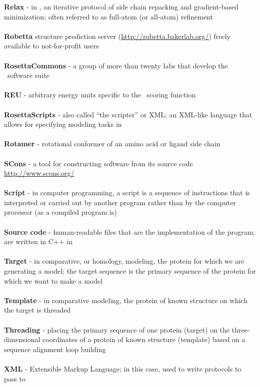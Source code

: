 \textbf{Relax} - in \rosetta, an iterative protocol of side chain repacking and gradient-based minimization; often referred to as full-atom (or all-atom) refinement \\ \\

\textbf{Robetta}  \rosetta structure prediction server (\url{http://robetta.bakerlab.org/}) freely available to not-for-profit users \\ \\

\textbf{RosettaCommons} - a group of more than twenty labs that develop the \rosetta~software suite  \\ \\

\textbf{REU} - arbitrary energy units specific to the \rosetta~scoring function \\ \\

\textbf{RosettaScripts} - also called ``the scripter'' or \rosetta XML; an XML-like language that allows for specifying modeling tasks in \rosetta \\ \\

\textbf{Rotamer} - rotational conformer of an amino acid or ligand side chain \\ \\

\textbf{SCons} - a tool for constructing software from its source code \url{http://www.scons.org/} \\ \\

\textbf{Script} - in computer programming, a script is a sequence of instructions that is interpreted or carried out by another program rather than by the computer processor (as a compiled program is) \\ \\

\textbf{Source code} - human-readable files that are the implementation of the program; are written in C++ in \rosetta \\ \\

\textbf{Target} - in comparative, or homology, modeling, the protein for which we are generating a model; the target sequence is the primary sequence of the protein for which we want to make a model \\ \\

\textbf{Template} - in comparative modeling, the protein of known structure on which the target is threaded \\ \\

\textbf{Threading} - placing the primary sequence of one protein (target) on the three-dimensional coordinates of a protein of known structure (template) based on a sequence alignment loop building \\ \\

\textbf{XML} - Extensible Markup Language; in this case, used to write protocols to pass to

\clearpage